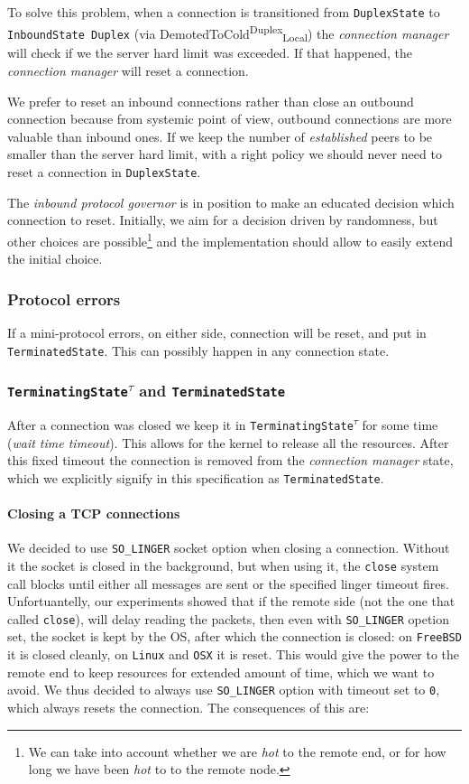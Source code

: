 \documentclass{article}
\def\DuplexState{\texttt{DuplexState}}
\def\InboundStateDup{\texttt{InboundState Duplex}}
\def\TerminatingState{\texttt{TerminatingState\textsuperscript{$\tau$}}}
\def\TerminatedState{\texttt{TerminatedState}}
\def\DemotedToColdDupLoc{\textsf{DemotedToCold}\textsuperscript{\textsf{Duplex}}\textsubscript{\textsf{Local}}}
\def\hot{\textit{hot}}
\def\established{\textit{established}}
\def\connmngr{\textit{connection manager}}
\begin{document}
To solve this problem, when a connection is transitioned from 
\DuplexState{} to \InboundStateDup{} (via \DemotedToColdDupLoc{}) the
\connmngr{} will check if we the server hard limit was exceeded.  If that
happened, the \connmngr{} will reset a connection.

We prefer to reset an inbound connections rather than close an outbound
connection because from systemic point of view, outbound connections are more
valuable than inbound ones.  If we keep the number of \established{} peers to
be smaller than the server hard limit, with a right policy we should never need
to reset a connection in \DuplexState{}.

The \textit{inbound protocol governor} is in position to make an educated
decision which connection to reset.  Initially, we aim for a decision driven by
randomness, but other choices are possible\footnote{We can take into account
whether we are \hot{} to the remote end, or for how long we have been \hot{} to
to the remote node.} and the implementation should allow to easily extend the
initial choice.


\subsubsection{Protocol errors}
If a mini-protocol errors, on either side, connection will be reset, and put in
\TerminatedState{}.  This can possibly happen in any connection state.

\subsubsection{\TerminatingState{} and \TerminatedState{}}
After a connection was closed we keep it in \TerminatingState{} for some time
(\textit{wait time timeout}).  This allows for the kernel to release all the
resources.  After this fixed timeout the connection is removed from the
\connmngr{} state, which we explicitly signify in this specification as
\TerminatedState{}.


\paragraph{Closing a TCP connections}
We decided to use \texttt{SO\_LINGER} socket option when closing a connection.
Without it the socket is closed in the background, but when using it, the
\texttt{close} system call blocks until either all messages are sent or the
specified linger timeout fires.  Unfortuantelly, our experiments showed that if
the remote side (not the one that called \texttt{close}), will delay reading
the packets, then even with \texttt{SO\_LINGER} opetion set, the socket is kept
by the OS, after which the connection is closed: on \texttt{FreeBSD}
it is closed cleanly, on \texttt{Linux} and \texttt{OSX} it is reset.  This
would give the power to the remote end to keep resources for extended amount of
time, which we want to avoid.  We thus decided to always use
\texttt{SO\_LINGER} option with timeout set to \texttt{0}, which always resets
the connection.  The consequences of this are:
\end{document}
